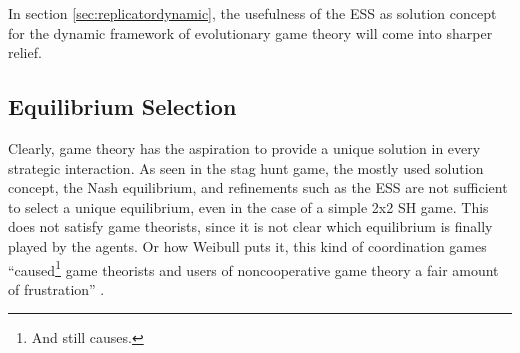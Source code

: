 In section \ref{sec:replicatordynamic}, the usefulness of the ESS as solution
concept for the dynamic framework of evolutionary game theory will come 
into sharper relief.

\subsection{Equilibrium Selection}
\label{sec:equilibriumselection}
Clearly, game theory has the aspiration to provide a unique solution in every
strategic interaction.
As seen in the stag hunt game, the mostly used solution concept, 
the Nash equilibrium, and refinements such as the ESS are
not sufficient to select a unique equilibrium, even in the case of a simple
2x2 SH game. This does not satisfy game theorists, since it is not clear which
equilibrium is finally played by the agents. Or how 
Weibull puts it, this kind of coordination games 
``caused\footnote{And still causes.} game theorists and users of 
noncooperative game theory a fair amount of frustration'' 
\parencite[30]{weibull_evolutionary_1997}. 

